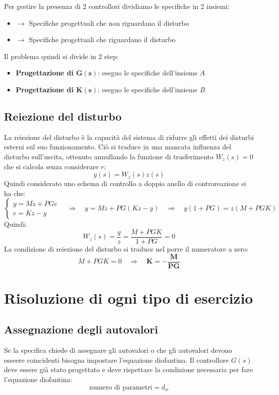 \documentclass{report}
\theoremstyle{nostyle}
\begin{document}
\noindent Per gestire la presenza di 2 controllori dividiamo le specifiche in 2 insiemi:
\begin{itemize}
    \item [\textbf{A.}] $\to$ Specifiche progettuali che non riguardano il disturbo
    \item [\textbf{B.}] $\to$ Specifiche progettuali che riguardano il disturbo
\end{itemize}
Il problema quindi si divide in 2 step:
\begin{itemize}
    \item \textbf{Progettazione di $\bm{G(s)}$}: eseguo le specifiche dell'insieme $A$
    \item \textbf{Progettazione di $\bm{K(s)}$}: eseguo le specifiche dell'insieme $B$
\end{itemize}

\subsection{Reiezione del disturbo}
La reiezione del disturbo è la capacità del sistema di ridurre gli effetti dei disturbi esterni sul suo funzionamento. Ciò si traduce in una mancata influenza del disturbo sull'uscita, ottenuto annullando la funzione di 
trasferimento $W_z(s) = 0$ che si calcola senza considerare $r$:
\[      y(s) = W_z(s) z(s)    \]
Quindi considerato uno schema di controllo a doppio anello di controreazione si ha che:
\[\begin{cases}
    y = Mz + PGe \\
    e = Kz -y
\end{cases}  \quad \Longrightarrow \quad y = Mz + PG(Kz-y) \quad \Longrightarrow \quad y (1+PG) = z (M+PGK) 
\]
Quindi:
\[     W_z(s) = \frac{y}{z} = \frac{M+PGK}{1+PG}  = 0       \]
La condizione di reiezione del disturbo si traduce nel porre il numeratore a zero:
\[     M+PGK = 0\quad \Longrightarrow \quad \bm{K = - \frac{M}{PG}}         \]




\section{Risoluzione di ogni tipo di esercizio}
\subsection{Assegnazione degli autovalori}
Se la specifica chiede di assegnare gli autovalori o che gli autovalori devono esseere coincidenti bisogna impostare l'equazione diofantina. Il controllore $G(s)$ deve essere già stato
progettato e deve rispettare la condizione necessaria per fare l'equazione diofantina:
\[   \text{numero di parametri} = d_w    \]
\end{document}
